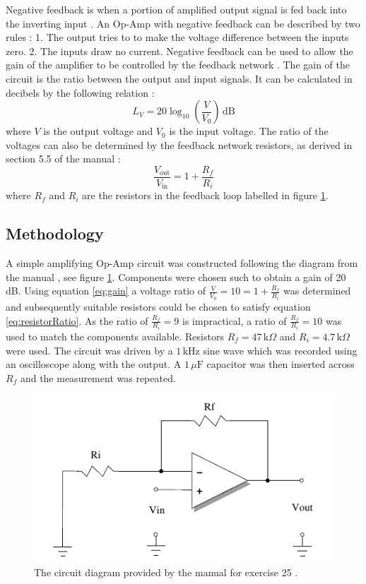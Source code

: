 \documentclass[%
reprint,
amsmath,amssymb,
aps,
floatfix
]{revtex4-2}
\begin{document}
		Negative feedback is when a portion of amplified output signal is fed back into the inverting input \cite{horowitz}. An Op-Amp with negative feedback can be described by two rules \cite{manual}: 1. The output tries to to make the voltage difference between the inputs zero. 2. The inputs draw no current. Negative feedback can be used to allow the gain of the amplifier to be controlled by the feedback network \cite{manual}. The gain of the circuit is the ratio between the output and input signals. It can be calculated in decibels by the following relation \cite{sengpiel}:
		\begin{equation}
			L_V = 20 \log_{10}\left(\frac{V}{V_0}\right)\,\text{dB}
			\label{eq:gain}
		\end{equation}where $V$ is the output voltage and $V_0$ is the input voltage. The ratio of the voltages can also be determined by the feedback network resistors, as derived in section 5.5 of the manual \cite{manual}:
		\begin{equation}
			\frac{V_\text{out}}{V_\text{in}} = 1 + \frac{R_f}{R_i}
			\label{eq:resistorRatio}
		\end{equation}where $R_f$ and $R_i$ are the resistors in the feedback loop labelled in figure \ref{fig:ex25Circuit}.
		
		\subsection{Methodology}
		A simple amplifying Op-Amp circuit was constructed following the diagram from the manual \cite{manual}, see figure \ref{fig:ex25Circuit}. Components were chosen such to obtain a gain of 20 dB. Using equation \ref{eq:gain} a voltage ratio of $\frac{V}{V_0} = 10 = 1 + \frac{R_f}{R_i}$ was determined and subsequently suitable resistors could be chosen to satisfy equation \ref{eq:resistorRatio}. As the ratio of $\frac{R_f}{R_i} = 9$ is impractical, a ratio of $\frac{R_f}{R_i} = 10$ was used to match the components available. Resistors $R_f = 47\,\text{k}\Omega$ and $R_i = 4.7\,\text{k}\Omega$ were used. The circuit was driven by a $1\,\text{kHz}$ sine wave which was recorded using an oscilloscope along with the output. A $1 \,\mu \text{F}$ capacitor was then inserted across $R_f$ and the measurement was repeated.
		
		\begin{figure}
			\includegraphics[width=0.85\columnwidth]{ex25Circuit.png}
			\caption{\label{fig:ex25Circuit}The circuit diagram provided by the manual for exercise 25 \cite{manual}.}
		\end{figure}
	
\end{document}
